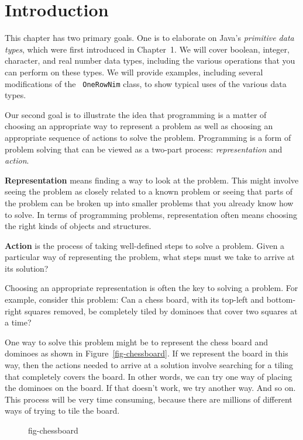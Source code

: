\section{Introduction}
\noindent This chapter has two primary goals.  One is to elaborate on Java's
{\it primitive data types}, which were first introduced in Chapter~1.
We will cover boolean, integer, character, and real number data types,
including the various operations that you can perform on these types.
We will provide examples, including several modifications of the {\tt
OneRowNim} class, to show typical uses of the various data types.

Our second goal is to illustrate the idea that programming is a matter
of choosing an appropriate way to represent a problem as well as
choosing an appropriate sequence of actions to solve the problem.
Programming is a form of problem solving that can be viewed as a
two-part process: {\it representation} and {\it action}.

{\bf Representation} means finding a way to look at the problem.  This
might involve seeing the problem as closely related to a known problem
or seeing that parts of the problem can be broken up into smaller
problems that you already know how to solve.  In terms of programming
problems, representation often means choosing the right kinds of
objects and structures.

{\bf Action} is the process of taking well-defined steps to solve a
problem.  Given a particular way of representing the problem, what
steps must we take to arrive at its solution?

Choosing an appropriate representation is often the key to solving a
problem.  For example, consider this problem: Can a chess board, with
its top-left and bottom-right squares removed, be completely tiled by
dominoes that cover two squares at a time?

One way to solve this problem might be to represent the chess board and
dominoes as shown in Figure~\ref{fig-chessboard}. If we represent the
board in this way, then the actions needed to arrive at a solution
involve searching for a tiling that completely covers the board.  In
other words, we can try one way of placing the dominoes on the board.
If that doesn't work, we try another way.  And so on.  This process
will be very time consuming, because there are millions of different
ways of trying to tile the board.

\begin{figure}[tb]
 {fig-chessboard}
\end{figure}

